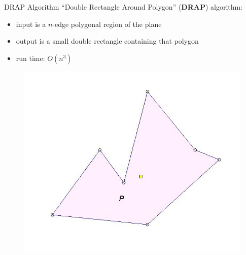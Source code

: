 \begin{frame}{DRAP Algorithm}
  ``Double Rectangle Around Polygon'' (\textbf{DRAP}) algorithm:\\
  \begin{itemize}
  \item input is a $n$-edge polygonal region of the plane
  \item output is a small double rectangle containing that polygon
  \item run time: $O(n^3)$
  \end{itemize}
  \begin{figure}
    \includegraphics[scale=0.3]{figs/drapP.jpg}
  \end{figure}
\end{frame}

